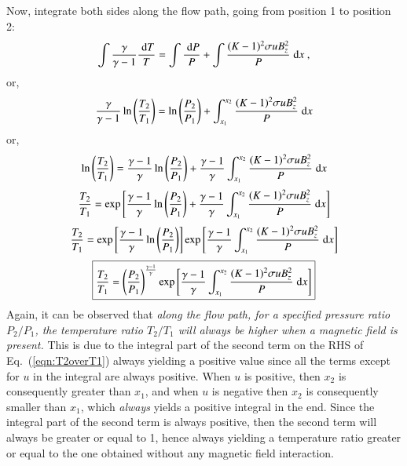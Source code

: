 \documentclass{warpdoc}
\newcommand\frameeqn[1]{\fbox{$\displaystyle #1$}}
\newcommand{\ordi}{\; {\rm d}}
\begin{document}
%
Now, integrate both sides along the flow path, going from position 1 to position 2:
%
\begin{equation}
\int \frac{\gamma}{\gamma-1}\frac{\ordi T}{T}
= \int \frac{\ordi P}{P}
+ \int \frac{(K-1)^2 \sigma u B_z^2}{P} \ordi x~,
\end{equation}
%
or,
%
\begin{equation}
\frac{\gamma}{\gamma-1} \ln \left( \frac{T_2}{T_1} \right)
= \ln \left( \frac{P_2}{P_1} \right) + \int_{x_1}^{x_2} \frac{(K-1)^2 \sigma u B_z^2}{P} \ordi x
\end{equation}
%
or,
%
\begin{equation}
\ln \left( \frac{T_2}{T_1} \right)
=   \frac{\gamma-1}{\gamma} \ln \left( \frac{P_2}{P_1} \right)
  + \frac{\gamma-1}{\gamma}\int_{x_1}^{x_2} \frac{(K-1)^2 \sigma u B_z^2}{P} \ordi x
\end{equation}
%
%
\begin{equation}
\frac{T_2}{T_1}
= \exp \left[  \frac{\gamma-1}{\gamma} \ln \left( \frac{P_2}{P_1} \right)
  + \frac{\gamma-1}{\gamma}\int_{x_1}^{x_2} \frac{(K-1)^2 \sigma u B_z^2}{P} \ordi x \right]
\end{equation}
%
%
\begin{equation}
\frac{T_2}{T_1}
= \exp \left[  \frac{\gamma-1}{\gamma} \ln \left( \frac{P_2}{P_1} \right) \right]
  \exp \left[ \frac{\gamma-1}{\gamma}\int_{x_1}^{x_2} \frac{(K-1)^2 \sigma u B_z^2}{P} \ordi x \right]
\end{equation}
%
%
\begin{equation}
\frameeqn{
\frac{T_2}{T_1}
= \left( \frac{P_2}{P_1} \right)^\frac{\gamma-1}{\gamma}
  \exp \left[ \frac{\gamma-1}{\gamma}\int_{x_1}^{x_2} \frac{(K-1)^2 \sigma u B_z^2}{P} \ordi x \right]
}
\label{eqn:T2overT1}
\end{equation}
%
Again, it can be observed that \emph{along the flow path, for a specified pressure ratio $P_2/P_1$,
the temperature ratio $T_2/T_1$ will always be higher when a magnetic field
is present.} This is due to the integral part of the second term on the RHS of
Eq.\ (\ref{eqn:T2overT1}) always yielding a positive value since all the terms except for $u$
in the integral are always positive. When $u$ is positive, then $x_2$ is consequently greater
than $x_1$, and when $u$ is negative then $x_2$ is consequently smaller than $x_1$, which \emph{always}
yields a positive integral in the end. Since the integral part of the second term is always
positive, then the second term will always be greater or equal to 1, hence always yielding a
temperature ratio greater or equal to the one obtained without any magnetic field
interaction.
\end{document}
